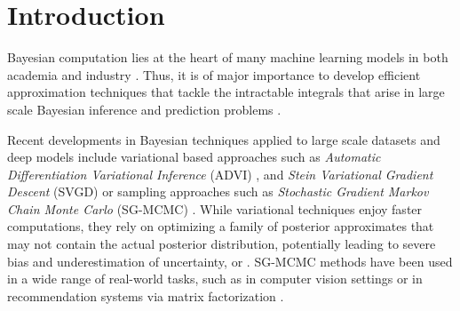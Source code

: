 

\section{Introduction}


Bayesian computation lies at the heart of many machine learning models in both academia and industry \cite{bishop2006pattern}. Thus, it is of major importance to develop efficient approximation techniques that tackle the intractable integrals that arise in large scale Bayesian inference and prediction problems \cite{gelman2013bayesian}. 

Recent developments in Bayesian techniques applied to large scale datasets and deep models include variational based approaches such as \emph{Automatic Differentiation Variational Inference} (ADVI) \cite{blei2017variational}, and \emph{Stein Variational Gradient Descent} (SVGD)  \cite{liu2016stein} or sampling approaches such as \emph{Stochastic Gradient Markov Chain Monte Carlo} (SG-MCMC) \cite{ma2015complete}. While variational techniques enjoy faster computations, they rely on optimizing a family of posterior approximates that may not contain the actual posterior distribution, potentially leading to severe bias and underestimation of uncertainty, \cite{pmlr-v80-yao18a} or \cite{48127}. SG-MCMC methods have been used in a wide range of real-world tasks, such as in computer vision settings \cite{7780980} or in recommendation systems via matrix factorization \cite{7952555}.%

